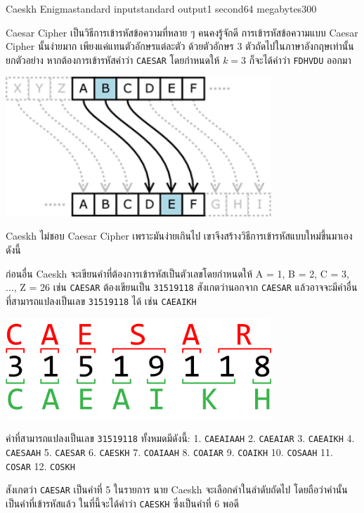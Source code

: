 \documentclass[11pt,a4paper]{article}
\begin{document}
\begin{problem}{Caeskh Enigma}{standard input}{standard output}{1 second}{64 megabytes}{300}

Caesar Cipher เป็นวิธีการเข้ารหัสข้อความที่หลาย ๆ คนคงรู้จักดี การเข้ารหัสข้อความแบบ Caesar Cipher นั้นง่ายมาก เพียงแค่แทนตัวอักษรแต่ละตัว ด้วยตัวอักษร 3 ตัวถัดไปในภาษาอังกฤษเท่านั้น ยกตัวอย่าง หากต้องการเข้ารหัสคำว่า \texttt{CAESAR} โดยกำหนดให้ $k=3$ ก็จะได้คำว่า \texttt{FDHVDU} ออกมา
\begin{center}
\includegraphics[width=10cm]{caesar.png}
\end{center}

Caeskh ไม่ชอบ Caesar Cipher เพราะมันง่ายเกินไป เขาจึงสร้างวิธีการเข้ารหัสแบบใหม่ขึ้นมาเอง ดังนี้

ก่อนอื่น Caeskh จะเขียนคำที่ต้องการเข้ารหัสเป็นตัวเลขโดยกำหนดให้ A = 1, B = 2, C = 3, ..., Z = 26 เช่น \texttt{CAESAR} ต้องเขียนเป็น \texttt{31519118} สังเกตว่านอกจาก \texttt{CAESAR} แล้วอาจจะมีคำอื่นที่สามารถแปลงเป็นเลข \texttt{31519118} ได้ เช่น \texttt{CAEAIKH}
\begin{center}
\includegraphics[width=10cm]{caeskh.png}
\end{center}

คำที่สามารถแปลงเป็นเลข \texttt{31519118} ทั้งหมดมีดังนี้:
1. \texttt{CAEAIAAH}
2. \texttt{CAEAIAR}
3. \texttt{CAEAIKH}
4. \texttt{CAESAAH}
5. \texttt{CAESAR}
6. \texttt{CAESKH}
7. \texttt{COAIAAH}
8. \texttt{COAIAR}
9. \texttt{COAIKH}
10. \texttt{COSAAH}
11. \texttt{COSAR}
12. \texttt{COSKH}

สังเกตว่า \texttt{CAESAR} เป็นคำที่ 5 ในรายการ นาย Caeskh จะเลือกคำในลำดับถัดไป โดยถือว่าคำนั้นเป็นคำที่เข้ารหัสแล้ว ในที่นี้จะได้คำว่า \texttt{CAESKH} ซึ่งเป็นคำที่ 6 พอดี


\end{problem}
\end{document}
